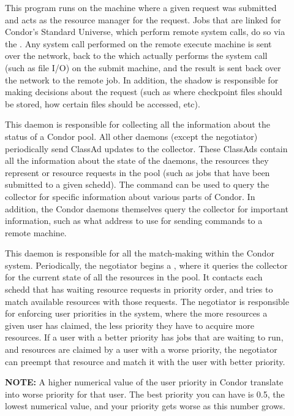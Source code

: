 \begin{description}
\item[] This program runs on the machine where a given
request was submitted and acts as the resource manager for the
request.  Jobs that are linked for Condor's Standard Universe, which
perform remote system calls, do so via the .  Any
system call performed on the remote execute machine is sent over the
network, back to the  which actually performs the
system call (such as file I/O) on the submit machine, and the result
is sent back over the network to the remote job.  In addition, the
shadow is responsible for making decisions about the request (such as
where checkpoint files should be stored, how certain files should be
accessed, etc).  

\item[] This daemon is responsible for collecting
all the information about the status of a Condor pool.  All other
daemons (except the negotiator) periodically send ClassAd updates to
the collector.  These ClassAds contain all the information about the
state of the daemons, the resources they represent or resource
requests in the pool (such as jobs that have been submitted to a given
schedd).  The  command can be used to query the
collector for specific information about various parts of Condor.  In
addition, the Condor daemons themselves query the collector for
important information, such as what address to use for sending
commands to a remote machine. 

\item[] This daemon is responsible for all the
match-making within the Condor system.  Periodically, the negotiator
begins a , where it queries the collector for
the current state of all the resources in the pool.  It contacts each
schedd that has waiting resource requests in priority order, and tries
to match available resources with those requests.  The negotiator is
responsible for enforcing user priorities in the system, where the
more resources a given user has claimed, the less priority they have
to acquire more resources.  If a user with a better priority has jobs
that are waiting to run, and resources are claimed by a user with a
worse priority, the negotiator can preempt that resource and match it
with the user with better priority.

\textbf{NOTE:} A higher numerical value of the user priority in Condor
translate into worse priority for that user.  The best priority you
can have is 0.5, the lowest numerical value, and your priority gets
worse as this number grows.


\end{description}
